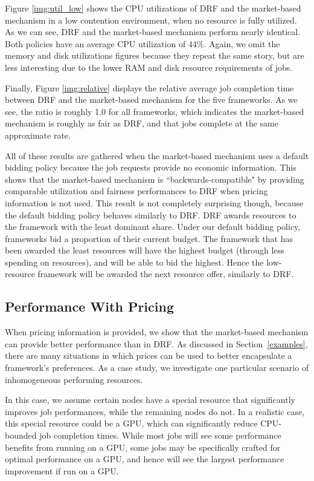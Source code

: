 \documentclass{acm_proc_article-sp}
\begin{document}
Figure \ref{img:util_low} shows the CPU utilizations of DRF and the market-based mechanism in a low contention environment, when no resource is fully utilized. As we can see, DRF and the market-based mechanism perform nearly identical. Both policies have an average CPU utilization of 44\%. Again, we omit the memory and disk utilizations figures because they repeat the same story, but are less interesting due to the lower RAM and disk resource requirements of jobs.

Finally, Figure \ref{img:relative} displays the relative average job completion time between DRF and the market-based mechanism for the five frameworks. As we see, the ratio is roughly 1.0 for all frameworks, which indicates the market-based mechanism is roughly as fair as DRF, and that jobs complete at the same approximate rate.

All of these results are gathered when the market-based mechanism uses a default bidding policy because the job requests provide no economic information. This shows that the market-based mechanism is ``backwards-compatible" by providing comparable utilization and fairness performances to DRF when pricing information is not used. This result is not completely surprising though, because the default bidding policy behaves similarly to DRF. DRF awards resources to the framework with the least dominant share. Under our default bidding policy, frameworks bid a proportion of their current budget. The framework that has been awarded the least resources will have the highest budget (through less spending on resources), and will be able to bid the highest. Hence the low-resource framework will be awarded the next resource offer, similarly to DRF.

\subsection{Performance With Pricing\\}

When pricing information is provided, we show that the market-based mechanism can provide better performance than in DRF. As discussed in Section~\ref{examples}, there are many situations in which prices can be used to better encapsulate a framework's preferences. As a case study, we investigate one particular scenario of inhomogeneous performing resources. 

In this case, we assume certain nodes have a special resource that significantly improves job performances, while the remaining nodes do not. In a realistic case, this special resource could be a GPU, which can significantly reduce CPU-bounded job completion times. While most jobs will see some performance benefits from running on a GPU, some jobs may be specifically crafted for optimal performance on a GPU, and hence will see the largest performance improvement if run on a GPU.
\end{document}
